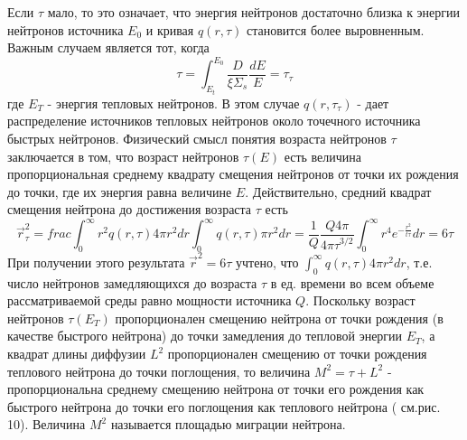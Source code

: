 \documentclass[a4paper]{article}
\begin{document}

    Если $\tau$ мало, то это означает, что энергия нейтронов
    достаточно близка к энергии нейтронов источника $E_0$ и кривая
    $q(r,\tau)$ становится более выровненным. Важным случаем является
    тот, когда
    \begin{equation}\nonumber
        \tau=\int_{E_t}^{E_0}\frac{D}{\xi\Sigma_s}\frac{dE}{E}=
        \tau_\tau
    \end{equation}
    где $E_T$ - энергия тепловых нейтронов. В этом случае 
    $q(r, \tau_\tau)$ - дает распределение источников тепловых
    нейтронов около точечного источника быстрых нейтронов. Физический
    смысл понятия возраста нейтронов $\tau$ заключается в том, что
    возраст нейтронов $\tau(E)$ есть величина пропорциональная среднему
    квадрату смещения нейтронов от точки их рождения до точки, где
    их энергия равна величине $E$. Действительно, средний квадрат
    смещения нейтрона до достижения возраста $\tau$ есть
    \begin{equation}
        \vec{r}_{\tau}^2 =
        frac{\int_0^{\infty}r^2 q(r, \tau)4\pi r^2 dr}
        {\int_0^{\infty}q(r,\tau)\pi r^2 dr} =
        \frac{1}{Q}\frac{Q4\pi}{{4\pi\tau}^{3/2}}
        \int_0^\infty r^4 e^{-\frac{r^2}{t\tau}}dr = 6\tau
    \end{equation}
    При получении этого результата \(\vec{r}^2 = 6\tau\)
    учтено, что \(\int_0^\infty q(r,\tau)4\pi r^2 dr\), т.е. число
    нейтронов замедляющихся до возраста $\tau$ в ед. времени во всем
    объеме рассматриваемой среды равно мощности источника $Q$.
    Поскольку возраст нейтронов $\tau(E_T)$ пропорционален смещению
    нейтрона от точки рождения (в качестве быстрого нейтрона) до
    точки замедления до тепловой энергии $E_T$, а квадрат длины
    диффузии $L^2$ пропорционален смещению от точки рождения
    теплового нейтрона до точки поглощения, то величина 
    \(M^2 = \tau + L^2\) - пропорциональна среднему смещению нейтрона
    от точки его рождения как быстрого нейтрона до точки его
    поглощения как теплового нейтрона ( см.рис. 10). Величина
    $M^2$ называется площадью миграции нейтрона.
\end{document}
